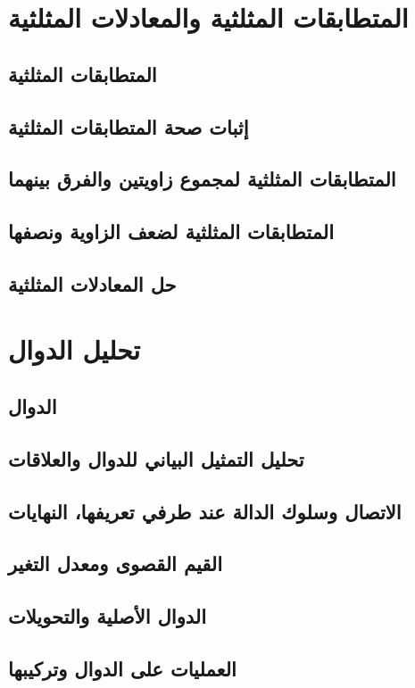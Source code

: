 \documentclass[12pt]{article}
\begin{document}
    \tableofcontents
    \section{المتطابقات المثلثية والمعادلات المثلثية}
        \subsection{المتطابقات المثلثية}
        \subsection{إثبات صحة المتطابقات المثلثية}
        \subsection{المتطابقات المثلثية لمجموع زاويتين والفرق بينهما}
        \subsection{المتطابقات المثلثية لضعف الزاوية ونصفها}
        \subsection{حل المعادلات المثلثية}
    \section{تحليل الدوال}
        \subsection{الدوال}
        \subsection{تحليل التمثيل البياني للدوال والعلاقات}
        \subsection{الاتصال وسلوك الدالة عند طرفي تعريفها، النهايات}
        \subsection{القيم القصوى ومعدل التغير}
        \subsection{الدوال الأصلية والتحويلات}
        \subsection{العمليات على الدوال وتركيبها}
\end{document}
